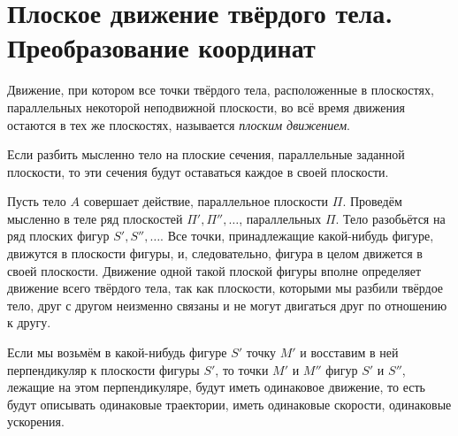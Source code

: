 \section{Плоское движение твёрдого тела. Преобразование координат}

\begin{definition}
  Движение, при котором все точки твёрдого тела, расположенные в плоскостях,
  параллельных некоторой неподвижной плоскости, во всё время движения остаются в
  тех же плоскостях, называется \textit{плоским движением}.

  Если разбить мысленно тело на плоские сечения, параллельные заданной
  плоскости, то эти сечения будут оставаться каждое в своей плоскости.
\end{definition}

\begin{figure}[H]
  \centering

  \caption{}
  \label{fig:14_1}
\end{figure}

Пусть тело $A$ совершает действие, параллельное плоскости $\Pi$. Проведём
мысленно в теле ряд плоскостей $\Pi', \Pi'', \dots$, параллельных $\Pi$. Тело
разобьётся на ряд плоских фигур $S', S'', \dots$. Все точки, принадлежащие
какой-нибудь фигуре, движутся в плоскости фигуры, и, следовательно, фигура в
целом движется в своей плоскости. Движение одной такой плоской фигуры вполне
определяет движение всего твёрдого тела, так как плоскости, которыми мы разбили
твёрдое тело, друг с другом неизменно связаны и не могут двигаться друг по
отношению к другу.

Если мы возьмём в какой-нибудь фигуре $S'$ точку $M'$ и восставим в ней
перпендикуляр к плоскости фигуры $S'$, то точки $M'$ и $M''$ фигур $S'$ и $S''$,
лежащие на этом перпендикуляре, будут иметь одинаковое движение, то есть будут
описывать одинаковые траектории, иметь одинаковые скорости, одинаковые
ускорения.

